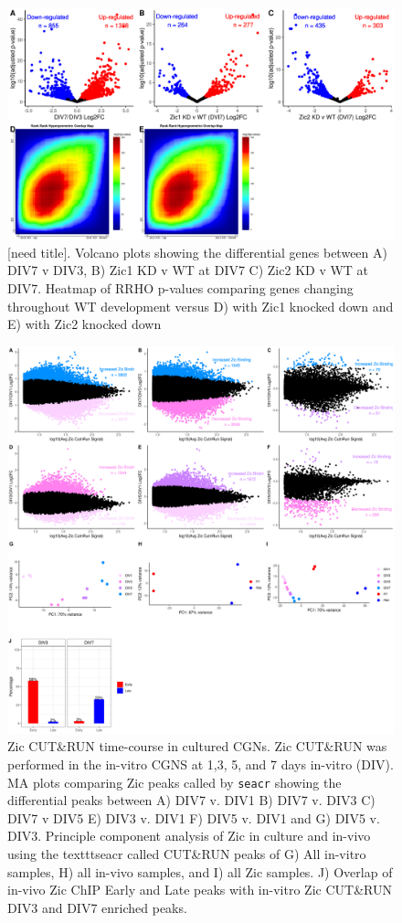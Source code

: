 \documentclass[fleqn,10pt]{wlscirep}
\begin{document}
\begin{figure}[!ht]
\centering
\includegraphics[width=.95\textwidth]{../figures/supp_figure_vitro.png}
\caption{ [need title]. Volcano plots showing the differential genes between A) DIV7 v DIV3, B) Zic1 KD v WT at DIV7 C) Zic2 KD v WT at DIV7. Heatmap of RRHO p-values comparing genes changing throughout WT  development versus D) with Zic1 knocked down and E) with Zic2 knocked down }
\label{fig:vitro}
\end{figure}

\begin{figure}[!ht]
\centering
\includegraphics[width=.95\textwidth]{../figures/supp_figure_cutrun.png}
\caption{ Zic CUT\&RUN time-course in cultured CGNs. Zic CUT\&RUN was performed in the in-vitro CGNS at 1,3, 5, and 7 days in-vitro (DIV). MA plots comparing Zic peaks called by \texttt{seacr} showing the differential peaks between A) DIV7 v. DIV1 B) DIV7 v. DIV3 C) DIV7 v DIV5 E) DIV3 v. DIV1 F) DIV5 v. DIV1 and G) DIV5 v. DIV3. Principle component analysis of Zic in culture and in-vivo using the texttt{seacr} called CUT\&RUN peaks of G) All in-vitro samples, H) all in-vivo samples, and I) all Zic samples. J) Overlap of in-vivo Zic ChIP Early and Late peaks with in-vitro Zic CUT\&RUN DIV3 and DIV7 enriched peaks.}
\label{fig:vitro_peak}
\end{figure}
\end{document}
